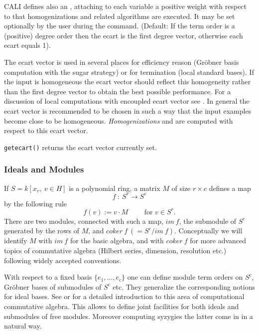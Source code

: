 CALI defines also an , attaching to each variable a
positive weight with respect to that homogenizations and related
algorithms are executed. It may be set optionally by the user during
the  command.  (Default: If the term order is a
(positive) degree order then the ecart is the first degree vector,
otherwise each ecart equals 1).

The ecart vector is used in several places for efficiency reason (Gr\"obner
basis computation with the sugar strategy) or for termination (local
standard bases). If the input is homogeneous the ecart vector should
reflect this homogeneity rather than the first degree vector to
obtain the best possible performance. For a discussion of local
computations with encoupled ecart vector see \cite{Graebe:94}. In general
the ecart vector is recommended to be chosen in such a way that the
input examples become close to be homogeneous. \emph{Homogenizations}
and  are computed with respect to this ecart
vector.
\medskip

\noindent \verb|getecart()| returns the ecart vector
currently set.


\subsubsection{Ideals and Modules}

If $S=k[x_v,\ v \in H]$ is a polynomial ring, a matrix $M$ of size
$r\times c$ defines a map
\[f\ :\ S^r \longrightarrow S^c\]
by the following rule
\[ f(v):=v\cdot M \qquad \mbox{ for } v \in S^r.\]
There are two modules, connected with such a map, $im\ f$, the
submodule of $S^c$ generated by the rows of $M$, and $coker\ f\
(=S^c/im\ f)$. Conceptually we will identify $M$ with $im\ f$ for the
basic algebra, and with $coker\ f$ for more advanced topics of
commutative algebra (Hilbert series, dimension, resolution etc.)
following widely accepted conventions.

With respect to a fixed basis $\{e_1,\ldots ,e_c\}$ one can define
module term orders on $S^c$, Gr\"obner bases of submodules of $S^c$ etc.
They generalize the corresponding notions for ideal bases. See
\cite{Eisenbud:95} or \cite{MoellerMora:86} for a detailed introduction to this area of
computational commutative algebra. This allows to define joint
facilities for both ideals and submodules of free modules. Moreover
computing syzygies the latter come in in a natural way.


